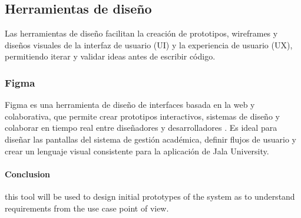\subsection{Herramientas de diseño}
Las herramientas de diseño facilitan la creación de prototipos, wireframes y diseños visuales de la interfaz de usuario (UI) y la experiencia de usuario (UX), permitiendo iterar y validar ideas antes de escribir código.

\subsubsection{Figma}
Figma es una herramienta de diseño de interfaces basada en la web y colaborativa, que permite crear prototipos interactivos, sistemas de diseño y colaborar en tiempo real entre diseñadores y desarrolladores \parencite{Figma}.
Es ideal para diseñar las pantallas del sistema de gestión académica, definir flujos de usuario y crear un lenguaje visual consistente para la aplicación de Jala University.

\paragraph{Conclusion} this tool will be used to design initial prototypes of the system as to understand requirements from the use case point of view.
